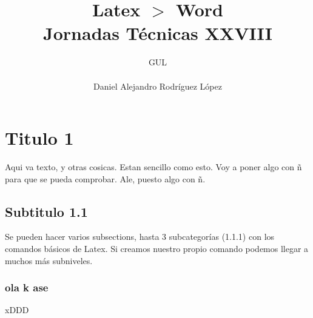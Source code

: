 \documentclass[10pt,a4paper,titlepage]{article} %
\title{ \textbf{ \Huge{Latex $>$ Word}} \\ Jornadas Técnicas XXVIII}
\author{
		\begin{tabular}{l}
			\multicolumn{1}{l}{GUL} \\ \hline \\
			Daniel Alejandro Rodríguez López \\
		\end{tabular}
}
\begin{document}
\maketitle
\newpage

\tableofcontents
\newpage

	\section{Titulo 1}
	Aqui va texto, y otras cosicas. Estan sencillo como esto. Voy a poner algo con ñ para que se pueda comprobar. Ale, puesto algo con ñ.

	\subsection{Subtitulo 1.1}
		Se pueden hacer varios subsections, hasta 3 subcategorías (1.1.1) con los comandos básicos de Latex. Si creamos nuestro propio comando podemos llegar a muchos más subniveles. 
		\subsubsection{ola k ase}
			xDDD
\end{document}
